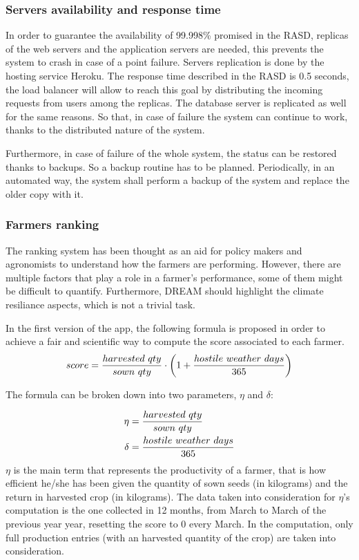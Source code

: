 \documentclass[table, 12pt]{article}
\begin{document}
\subsubsection{Servers availability and response time} 
\label{server_availability}
In order to guarantee the availability of 99.998\% promised in the RASD, replicas of the web servers and the application servers are needed, this prevents the system to crash in case of a point failure.
Servers replication is done by the hosting service Heroku.
The response time described in the RASD is 0.5 seconds, the load balancer will allow to reach this goal by distributing the incoming requests from users among the replicas.
The database server is replicated as well for the same reasons.
So that, in case of failure the system can continue to work, thanks to the distributed nature of the system. 

Furthermore, in case of failure of the whole system, the status can be restored thanks to backups. 
So a backup routine has to be planned.
Periodically, in an automated way, the system shall perform a backup of the system and replace the older copy with it.
\subsubsection{Farmers ranking} 
The ranking system has been thought as an aid for policy makers and agronomists to understand how the farmers are performing. However, there are multiple factors that play a role in a farmer's performance, some of them might be difficult to quantify. Furthermore, DREAM should highlight the climate resiliance aspects, which is not a trivial task.

In the first version of the app, the following formula is proposed in order to achieve a fair and scientific way to compute the score associated to each farmer.
\begin{equation}
    score = {harvested\ qty\over sown\ qty}\cdot \left( 1 + {hostile\ weather\ days\over 365}\right)
\end{equation}

The formula can be broken down into two parameters, $\eta$ and $\delta$:

\begin{align}  
    \eta &= {harvested\ qty\over sown\ qty}\\
    \delta &= {hostile\ weather\ days\over 365}
\end{align}
$\eta$ is the main term that represents the productivity of a farmer, that is how efficient he/she has been given the quantity of sown seeds (in kilograms) and the return in harvested crop (in kilograms). The data taken into consideration for $\eta$'s computation is the one collected in 12 months, from March to March of the previous year year\footnotemark, resetting the score to 0 every March.
In the computation, only full production entries (with an harvested quantity of the crop) are taken into consideration.
\end{document}
